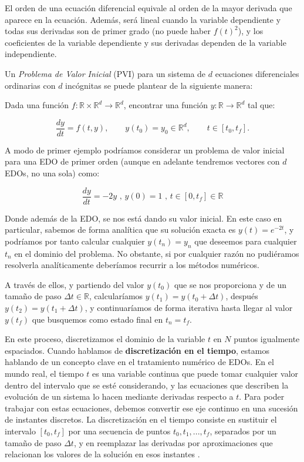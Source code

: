 El orden de una ecuación diferencial equivale al orden de la mayor derivada que aparece en la ecuación. Además, será lineal cuando la variable dependiente y todas sus derivadas son de primer grado (no puede haber $f(t)^2$), y los coeficientes de la variable dependiente y sus derivadas dependen de la variable independiente.

Un \textit{Problema de Valor Inicial} (PVI) para un sistema de $d$ ecuaciones diferenciales ordinarias con $d$ incógnitas se puede plantear de la siguiente manera\cite{Mantas2002}:

Dada una función $f : \mathbb{R} \times \mathbb{R}^d \rightarrow \mathbb{R}^d$, encontrar una función $y : \mathbb{R} \rightarrow \mathbb{R}^d$ tal que:

\begin{equation}
	\frac{dy}{dt} = f(t, y), \qquad y(t_0) = y_0 \in \mathbb{R}^d, \qquad t \in [t_0, t_f].
\end{equation}


A modo de primer ejemplo podríamos considerar un problema de valor inicial para una EDO de primer orden (aunque en adelante tendremos vectores con $d$ EDOs, no una sola) como:

\begin{equation}
	\label{eq:EjemploPVI}
	\frac{dy}{dt} = -2y \text{ , } y(0)=1 \text{ , } t \in [0,t_f] \in \mathbb{R}
\end{equation}

Donde además de la EDO, se nos está dando su valor inicial. En este caso en particular, sabemos de forma analítica que su solución exacta es $y(t) = e^{-2t}$, y podríamos por tanto calcular cualquier $y(t_n)=y_n$ que deseemos para cualquier $t_n$ en el dominio del problema. No obstante, si por cualquier razón no pudiéramos resolverla analíticamente deberíamos recurrir a los métodos numéricos. 

A través de ellos, y partiendo del valor $y(t_0)$ que se nos proporciona y de un tamaño de paso $\Delta t \in \mathbb{R}$, calcularíamos $y(t_1)=y(t_0+\Delta t)$, después $y(t_2)=y(t_1+\Delta t)$, y continuaríamos de forma iterativa hasta llegar al valor $y(t_f)$ que busquemos como estado final en $t_n=t_f$. 

En este proceso, discretizamos el dominio de la variable $t$ en $N$ puntos igualmente espaciados. Cuando hablamos de \textbf{discretización en el tiempo}, estamos hablando de un concepto clave en el tratamiento numérico de EDOs. En el mundo real, el tiempo $t$ es una variable continua que puede tomar cualquier valor dentro del intervalo que se esté considerando, y las ecuaciones que describen la evolución de un sistema lo hacen mediante derivadas respecto a $t$. Para poder trabajar con estas ecuaciones, debemos convertir ese eje continuo en una sucesión de instantes discretos. La discretización en el tiempo consiste en sustituir el intervalo $[t_0,t_f]$ por una secuencia de puntos $t_0, t_1, ..., t_f$, separados por un tamaño de paso $\Delta t$, y en reemplazar las derivadas por aproximaciones que relacionan los valores de la solución en esos instantes \cite{Kim2026}.

